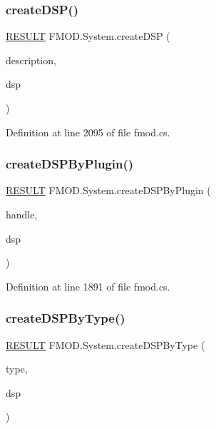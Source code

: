 \subsubsection{\texorpdfstring{create\+D\+S\+P()}{createDSP()}}
{\footnotesize\ttfamily \hyperlink{namespace_f_m_o_d_a305d1176ef3f8c8815861a60407ac33d}{R\+E\+S\+U\+LT} F\+M\+O\+D.\+System.\+create\+D\+SP (\begin{DoxyParamCaption}\item[{ref \hyperlink{struct_f_m_o_d_1_1_d_s_p___d_e_s_c_r_i_p_t_i_o_n}{D\+S\+P\+\_\+\+D\+E\+S\+C\+R\+I\+P\+T\+I\+ON}}]{description,  }\item[{out \hyperlink{class_f_m_o_d_1_1_d_s_p}{D\+SP}}]{dsp }\end{DoxyParamCaption})}



Definition at line 2095 of file fmod.\+cs.

\mbox{\label{class_f_m_o_d_1_1_system_a1a85a7b523518ba14073de66c091fb84}} 
\subsubsection{\texorpdfstring{create\+D\+S\+P\+By\+Plugin()}{createDSPByPlugin()}}
{\footnotesize\ttfamily \hyperlink{namespace_f_m_o_d_a305d1176ef3f8c8815861a60407ac33d}{R\+E\+S\+U\+LT} F\+M\+O\+D.\+System.\+create\+D\+S\+P\+By\+Plugin (\begin{DoxyParamCaption}\item[{uint}]{handle,  }\item[{out \hyperlink{class_f_m_o_d_1_1_d_s_p}{D\+SP}}]{dsp }\end{DoxyParamCaption})}



Definition at line 1891 of file fmod.\+cs.

\mbox{\label{class_f_m_o_d_1_1_system_a50d37ac7fda487d6e4a48ee98da62b2a}} 
\subsubsection{\texorpdfstring{create\+D\+S\+P\+By\+Type()}{createDSPByType()}}
{\footnotesize\ttfamily \hyperlink{namespace_f_m_o_d_a305d1176ef3f8c8815861a60407ac33d}{R\+E\+S\+U\+LT} F\+M\+O\+D.\+System.\+create\+D\+S\+P\+By\+Type (\begin{DoxyParamCaption}\item[{\hyperlink{namespace_f_m_o_d_abfbbfe13740257430ae8350c2456b0ff}{D\+S\+P\+\_\+\+T\+Y\+PE}}]{type,  }\item[{out \hyperlink{class_f_m_o_d_1_1_d_s_p}{D\+SP}}]{dsp }\end{DoxyParamCaption})}



